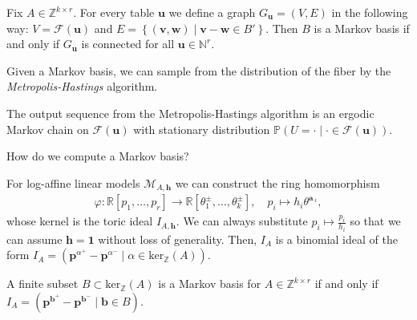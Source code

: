 \begin{remark}
  Fix \( A \in \mathbb{Z}^{k \times r} \).
  For every table \( \mathbf{u} \) we define a graph \( G_\mathbf u = (V,E) \) in the following way: \( V = \mathcal{F}(\mathbf{u}) \) and \( E = \left\{ (\mathbf v,\mathbf w)  \mid \mathbf v - \mathbf  w \in B' \right\} \). Then \( B \) is a Markov basis if and only if \( G_\mathbf u \) is connected for all \( \mathbf{u} \in \mathbb{N}^r \).
\end{remark}

Given a Markov basis, we can sample from the distribution of the fiber by the \emph{Metropolis-Hastings} algorithm.

\begin{thm}
  The output sequence from the Metropolis-Hastings algorithm is an ergodic Markov chain on \( \mathcal{F}(\mathbf{u}) \) with stationary distribution \( \mathbb{P}(U = \cdot \mid \cdot \in \mathcal{F}(\mathbf{u})) \).
\end{thm}

How do we compute a Markov basis?


For log-affine linear models \( \mathcal{M}_{A, \mathbf{h}} \) we can construct the ring homomorphism 
\begin{align*}
  \varphi: \mathbb{R}[p_1, \dots, p_r] \to \mathbb{R}[\theta_{1}^{\pm}, \dots, \theta_{k}^{\pm}], \quad p_i \mapsto h_i \theta^{\mathbf{a}_{\cdot i}},
\end{align*}
whose kernel is the toric ideal \( I_{A, \mathbf{h}} \). We can always substitute \( p_i \mapsto \frac{p_i}{h_i} \) so that we can assume \( \mathbf{h} = \mathbf{1} \) without loss of generality. Then, \( I_A \) is a binomial ideal of the form \( I_A = (\mathbf{p}^{\alpha^+} - \mathbf{p}^{\alpha^-} \mid \alpha \in \mathrm{ker}_\mathbb{Z}(A)) \).

\begin{thm}
  A finite subset \( B \subset \mathrm{ker}_{\mathbb{Z}}(A) \) is a Markov basis for \( A \in \mathbb{Z}^{k \times r} \) if and only if \( I_A = (\mathbf p^{\mathbf{b}^+} - \mathbf p^{\mathbf{b}^-} \mid \mathbf{b} \in B) \).
\end{thm}

